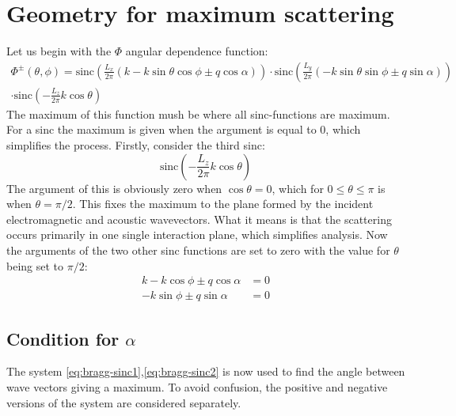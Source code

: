 \documentclass[10pt,a4paper]{eitExjobb}
\begin{document}
	\section{Geometry for maximum scattering \label{sec:app-derivations-bragg}}
	Let us begin with the $\Phi$ angular dependence function:
	\begin{multline*}
	\Phi^\pm(\theta,\phi) = \text{sinc} \left( \frac{L_x}{2\pi} \left( k - k\sin{\theta}\cos{\phi} \pm q\cos{\alpha} \right) \right) 
	\cdot \text{sinc} \left( \frac{L_y}{2\pi} \left( -k\sin{\theta}\sin{\phi} \pm q\sin{\alpha} \right) \right) \\
	\cdot \text{sinc} \left( -\frac{L_z}{2\pi} k\cos{\theta} \right)
	\end{multline*}
	The maximum of this function mush be where all sinc-functions are maximum. For a sinc the maximum is given when the argument is equal to 0, which simplifies the process. Firstly, consider the third sinc:
	\begin{equation*}
	\text{sinc} \left( -\frac{L_z}{2\pi} k\cos{\theta} \right)
	\end{equation*}
	The argument of this is obviously zero when $\cos{\theta} = 0$, which for $0 \leq \theta \leq \pi$ is when $\theta = \pi/2$. This fixes the maximum to the plane formed by the incident electromagnetic and acoustic wavevectors. What it means is that the scattering occurs primarily in one single interaction plane, which simplifies analysis. Now the arguments of the two other sinc functions are set to zero with the value for $\theta$ being set to $\pi/2$:
	\begin{align}
	k - k\cos{\phi} \pm q\cos{\alpha} &= 0 \label{eq:bragg-sinc1} \\
	-k\sin{\phi} \pm q\sin{\alpha} &= 0 \label{eq:bragg-sinc2}
	\end{align}
	
	\subsection{Condition for $\alpha$}
	The system \ref{eq:bragg-sinc1},\ref{eq:bragg-sinc2} is now used to find the angle between wave vectors giving a maximum. To avoid confusion, the positive and negative versions of the system are considered separately.
	
\end{document}
